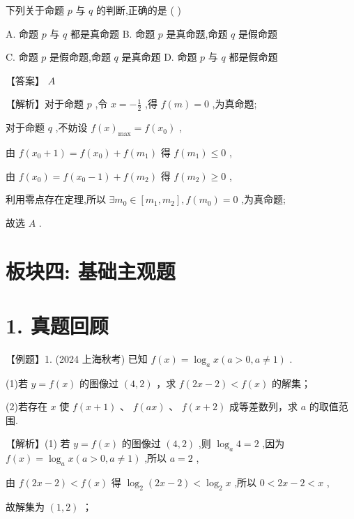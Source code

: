 \documentclass[10pt]{article}
\begin{document}
下列关于命题 \(p\) 与 \(q\) 的判断,正确的是 ( )

A. 命题 \(p\) 与 \(q\) 都是真命题 B. 命题 \(p\) 是真命题,命题 \(q\) 是假命题

C. 命题 \(p\) 是假命题,命题 \(q\) 是真命题 D. 命题 \(p\) 与 \(q\) 都是假命题

【答案】 \(A\)

【解析】对于命题 \(p\) ,令 \(x =  - \frac{1}{2}\) ,得 \(f\left( m\right)  = 0\) ,为真命题;

对于命题 \(q\) ,不妨设 \(f{\left( x\right) }_{\max } = f\left( {x}_{0}\right)\) ,

由 \(f\left( {{x}_{0} + 1}\right)  = f\left( {x}_{0}\right)  + f\left( {m}_{1}\right)\) 得 \(f\left( {m}_{1}\right)  \leq  0\) ,

由 \(f\left( {x}_{0}\right)  = f\left( {{x}_{0} - 1}\right)  + f\left( {m}_{2}\right)\) 得 \(f\left( {m}_{2}\right)  \geq  0\) ,

利用零点存在定理,所以 \(\exists {m}_{0} \in  \left\lbrack  {{m}_{1},{m}_{2}}\right\rbrack  ,f\left( {m}_{0}\right)  = 0\) ,为真命题;

故选 \(A\) .

\section*{板块四: 基础主观题}

\section*{1. 真题回顾}

【例题】1. (2024 上海秋考) 已知 \(f\left( x\right)  = {\log }_{a}x\left( {a > 0,a \neq  1}\right)\) .

(1)若 \(y = f\left( x\right)\) 的图像过 \(\left( {4,2}\right)\) ，求 \(f\left( {{2x} - 2}\right)  < f\left( x\right)\) 的解集；

(2)若存在 \(x\) 使 \(f\left( {x + 1}\right)\) 、 \(f\left( {ax}\right)\) 、 \(f\left( {x + 2}\right)\) 成等差数列，求 \(a\) 的取值范围.

【解析】(1) 若 \(y = f\left( x\right)\) 的图像过 \(\left( {4,2}\right)\) ,则 \({\log }_{a}4 = 2\) ,因为 \(f\left( x\right)  = {\log }_{a}x\left( {a > 0,a \neq  1}\right)\) ,所以 \(a = 2\) ,

由 \(f\left( {{2x} - 2}\right)  < f\left( x\right)\) 得 \({\log }_{2}\left( {{2x} - 2}\right)  < {\log }_{2}x\) ,所以 \(0 < {2x} - 2 < x\) ,

故解集为 \(\left( {1,2}\right)\) ；
\end{document}

